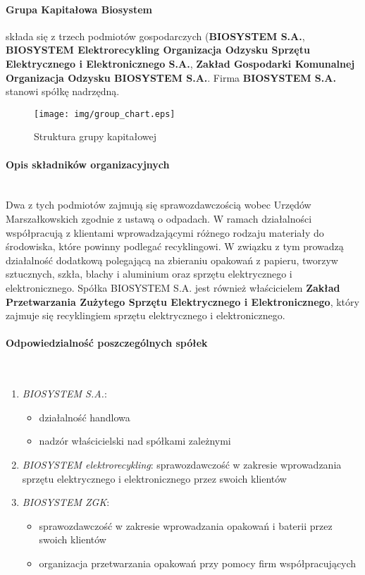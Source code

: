 

\paragraph{Grupa Kapitałowa Biosystem} składa się z trzech podmiotów gospodarczych (\textbf{BIOSYSTEM S.A.}, \textbf{BIOSYSTEM Elektrorecykling Organizacja Odzysku Sprzętu Elektrycznego i Elektronicznego S.A.}, \textbf{Zakład Gospodarki Komunalnej Organizacja Odzysku BIOSYSTEM S.A.}. Firma \textbf{BIOSYSTEM S.A.} stanowi spółkę nadrzędną.

\begin{figure}[H]
	\centering
	\texttt{[image: img/group\_chart.eps]}
	\caption{Struktura grupy kapitałowej}
\end{figure}

\paragraph{Opis składników organizacyjnych} \ \\
Dwa z tych podmiotów zajmują się sprawozdawczością wobec Urzędów Marszałkowskich zgodnie z ustawą o odpadach.
W ramach działalności współpracują z klientami wprowadzającymi różnego rodzaju materiały do środowiska, które powinny podlegać recyklingowi.
W związku z tym prowadzą działalność dodatkową polegającą na zbieraniu opakowań z papieru, tworzyw sztucznych, szkła, blachy i aluminium oraz sprzętu elektrycznego i elektronicznego.
Spółka BIOSYSTEM S.A. jest również właścicielem \textbf{Zakład Przetwarzania Zużytego Sprzętu Elektrycznego i Elektronicznego}, który zajmuje się recyklingiem sprzętu elektrycznego i elektronicznego. 

\paragraph{Odpowiedzialność poszczególnych spółek} \ \\
\begin{enumerate}
	\item \emph{BIOSYSTEM S.A.}: 
		\begin{itemize}
			\item działalność handlowa
			\item nadzór właścicielski nad spółkami zależnymi
		\end{itemize}
	\item \emph{BIOSYSTEM elektrorecykling}: sprawozdawczość w zakresie wprowadzania sprzętu elektrycznego i elektronicznego przez swoich klientów \\
	\item \emph{BIOSYSTEM ZGK}:
		\begin{itemize}
			\item sprawozdawczość w zakresie wprowadzania opakowań i baterii przez swoich klientów
			\item organizacja przetwarzania opakowań przy pomocy firm współpracujących
		\end{itemize}
\end{enumerate}

